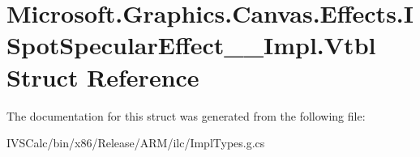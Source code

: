 \hypertarget{struct_microsoft_1_1_graphics_1_1_canvas_1_1_effects_1_1_i_spot_specular_effect_____impl_1_1_vtbl}{}\section{Microsoft.\+Graphics.\+Canvas.\+Effects.\+I\+Spot\+Specular\+Effect\+\_\+\+\_\+\+Impl.\+Vtbl Struct Reference}
\label{struct_microsoft_1_1_graphics_1_1_canvas_1_1_effects_1_1_i_spot_specular_effect_____impl_1_1_vtbl}


The documentation for this struct was generated from the following file\+:\begin{DoxyCompactItemize}
\item 
I\+V\+S\+Calc/bin/x86/\+Release/\+A\+R\+M/ilc/Impl\+Types.\+g.\+cs\end{DoxyCompactItemize}
